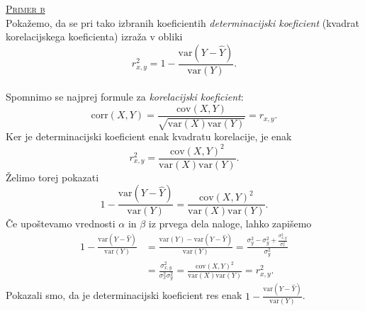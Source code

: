 \documentclass[a4paper,12pt]{article}
\begin{document}
\noindent
\textsc{\underline{Primer b}}
\\
Pokažemo, da se pri tako izbranih koeficientih \textit{determinacijski koeficient} (kvadrat korelacijskega koeficienta) izraža v obliki
$$ r_{x,y}^2 = 1 - \frac{\text{var}(Y - \hat{Y})}{\text{var}(Y)}. $$
\\
Spomnimo se najprej formule za \textit{korelacijski koeficient}: 
$$ \text{corr}(X,Y) = \frac{\text{cov}(X,Y)}{\sqrt{\text{var}(X) \text{var}(Y)}} = r_{x,y}. $$
Ker je determinacijski koeficient enak kvadratu korelacije, je enak
$$ r_{x,y}^2 = \frac{\text{cov}(X,Y)^2}{\text{var}(X) \text{var}(Y)}. $$
Želimo torej pokazati
$$ 1 - \frac{\text{var}(Y - \hat{Y})}{\text{var}(Y)} = \frac{\text{cov}(X,Y)^2}{\text{var}(X) \text{var}(Y)}. $$
Če upoštevamo vrednosti $\alpha$ in $\beta$ iz prvega dela naloge, lahko zapišemo
\begin{align*} 
    1 - \frac{\text{var}(Y - \hat{Y})}{\text{var}(Y)} &= \frac{\text{var}(Y) - \text{var}(Y - \hat{Y})}{\text{var}(Y)} = \frac{\sigma_y^2 - \sigma_y^2 + \frac{\sigma_{x,y}^2}{\sigma_x^2}}{\sigma_y^2} 
    \\
    &= \frac{\sigma_{x,y}^2}{\sigma_x^2 \sigma_y^2} = \frac{\text{cov}(X,Y)^2}{\text{var}(X) \text{var}(Y)} = r_{x,y}^2. 
\end{align*}
Pokazali smo, da je determinacijski koeficient res enak $1 - \frac{\text{var}(Y - \hat{Y})}{\text{var}(Y)}$.

\end{document}
